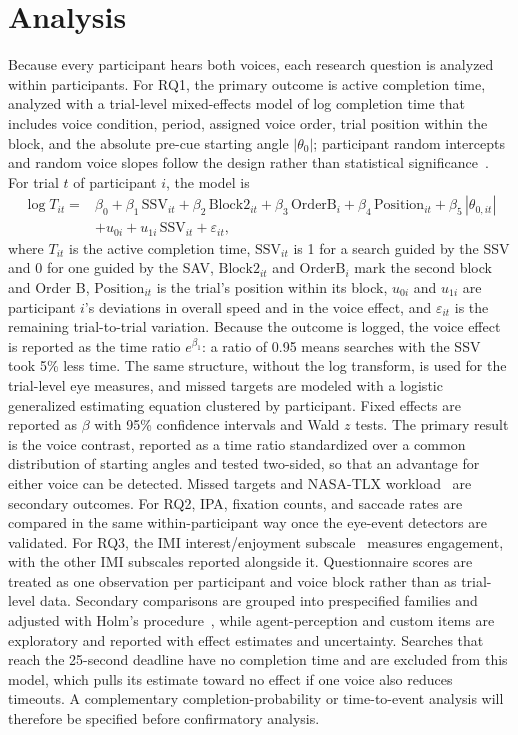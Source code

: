 \section{Analysis}
\label{sec:analysis-plan}
Because every participant hears both voices, each research question is analyzed within participants. For RQ1, the primary outcome is active completion time, analyzed with a trial-level mixed-effects model of log completion time that includes voice condition, period, assigned voice order, trial position within the block, and the absolute pre-cue starting angle $|\theta_0|$; participant random intercepts and random voice slopes follow the design rather than statistical significance~\cite{barr2013random}. For trial $t$ of participant $i$, the model is
\begin{equation}
\begin{split}
\log T_{it} ={}& \beta_0+\beta_1\,\mathrm{SSV}_{it}+\beta_2\,\mathrm{Block2}_{it}+\beta_3\,\mathrm{OrderB}_{i}+\beta_4\,\mathrm{Position}_{it}+\beta_5\,|\theta_{0,it}|\\
&+u_{0i}+u_{1i}\,\mathrm{SSV}_{it}+\varepsilon_{it},
\end{split}
\end{equation}
where $T_{it}$ is the active completion time, $\mathrm{SSV}_{it}$ is 1 for a search guided by the SSV and 0 for one guided by the SAV, $\mathrm{Block2}_{it}$ and $\mathrm{OrderB}_{i}$ mark the second block and Order B, $\mathrm{Position}_{it}$ is the trial's position within its block, $u_{0i}$ and $u_{1i}$ are participant $i$'s deviations in overall speed and in the voice effect, and $\varepsilon_{it}$ is the remaining trial-to-trial variation. Because the outcome is logged, the voice effect is reported as the time ratio $e^{\beta_1}$: a ratio of 0.95 means searches with the SSV took 5\% less time. The same structure, without the log transform, is used for the trial-level eye measures, and missed targets are modeled with a logistic generalized estimating equation clustered by participant. Fixed effects are reported as $\beta$ with 95\% confidence intervals and Wald $z$ tests. The primary result is the voice contrast, reported as a time ratio standardized over a common distribution of starting angles and tested two-sided, so that an advantage for either voice can be detected. Missed targets and NASA-TLX workload~\cite{hart1988nasatlx} are secondary outcomes. For RQ2, IPA, fixation counts, and saccade rates are compared in the same within-participant way once the eye-event detectors are validated. For RQ3, the IMI interest/enjoyment subscale~\cite{mcauley1989imi} measures engagement, with the other IMI subscales reported alongside it. Questionnaire scores are treated as one observation per participant and voice block rather than as trial-level data. Secondary comparisons are grouped into prespecified families and adjusted with Holm's procedure~\cite{holm1979simple}, while agent-perception and custom items are exploratory and reported with effect estimates and uncertainty. Searches that reach the 25-second deadline have no completion time and are excluded from this model, which pulls its estimate toward no effect if one voice also reduces timeouts. A complementary completion-probability or time-to-event analysis will therefore be specified before confirmatory analysis.

